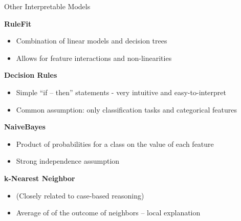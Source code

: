 \documentclass[11pt,compress,t,notes=noshow, aspectratio=169, xcolor=table]{beamer}
\begin{document}
\begin{frame}[c]{Other Interpretable Models}

\textbf{RuleFit} 
\begin{itemize}
    \item Combination of linear models and decision trees 
    \item Allows for feature interactions and non-linearities
\end{itemize}

\textbf{Decision Rules} 
\begin{itemize}
    \item Simple ``if -- then'' statements - very intuitive and easy-to-interpret
    \item Common assumption: only classification tasks and categorical features
\end{itemize}

\textbf{NaiveBayes}
\begin{itemize}
    \item Product of probabilities for a class on the value of each feature
    \item Strong independence assumption
\end{itemize}


\textbf{k-Nearest Neighbor}
\begin{itemize}
    \item (Closely related to case-based reasoning)
    \item Average of of the outcome of neighbors -- local explanation
\end{itemize}

\end{frame}


\endlecture
\end{document}
